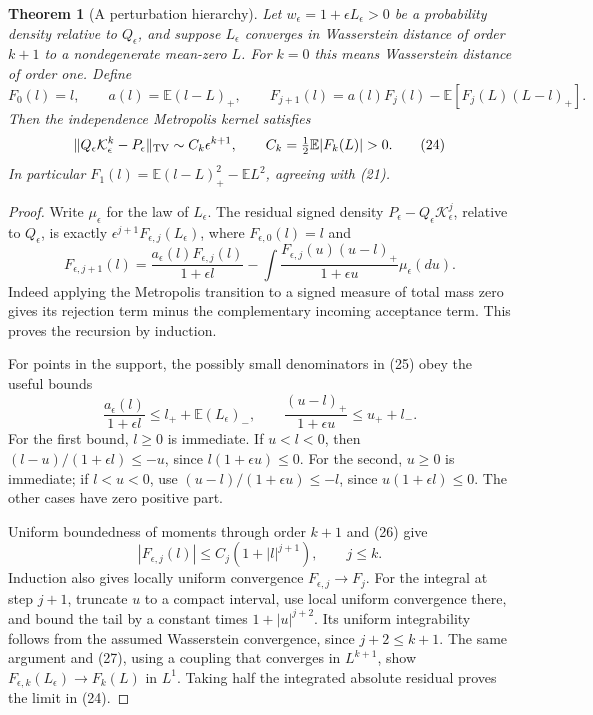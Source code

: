 \documentclass[11pt]{article}
\newtheorem{theorem}{Theorem}\newtheorem{lemma}[theorem]{Lemma}
\newcommand{\E}{\mathbb E}\newcommand{\R}{\mathbb R}
\begin{document}
\begin{theorem}[A perturbation hierarchy]\label{thm:hierarchy}
Let $w_\epsilon=1+\epsilon L_\epsilon>0$ be a probability density
relative to $Q_\epsilon$, and suppose $L_\epsilon$ converges in
Wasserstein distance of order $k+1$ to a nondegenerate mean-zero $L$.
For $k=0$ this means Wasserstein distance of order one. Define
\[
 F_0(l)=l,\qquad a(l)=\E(l-L)_+,\qquad
 F_{j+1}(l)=a(l)F_j(l)-\E[F_j(L)(L-l)_+].               \tag{23}
\]
Then the independence Metropolis kernel satisfies
\[
 \|Q_\epsilon\mathcal K_\epsilon^k-P_\epsilon\|_{\TV}
       \sim C_k\epsilon^{k+1},\qquad
 C_k=\tfrac12\E|F_k(L)|>0.                             \tag{24}
\]
In particular $F_1(l)=\E(l-L)_+^2-\E L^2$, agreeing with (21).
\end{theorem}
\begin{proof}
Write $\mu_\epsilon$ for the law of $L_\epsilon$. The residual signed
density $P_\epsilon-Q_\epsilon\mathcal K_\epsilon^j$, relative to
$Q_\epsilon$, is exactly $\epsilon^{j+1}F_{\epsilon,j}(L_\epsilon)$,
where $F_{\epsilon,0}(l)=l$ and
\[
 F_{\epsilon,j+1}(l)=
 \frac{a_\epsilon(l)F_{\epsilon,j}(l)}{1+\epsilon l}
 -\int\frac{F_{\epsilon,j}(u)(u-l)_+}{1+\epsilon u}
                                                    \mu_\epsilon(du).
 \tag{25}
\]
Indeed applying the Metropolis transition to a signed measure of total
mass zero gives its rejection term minus the complementary incoming
acceptance term. This proves the recursion by induction.

For points in the support, the possibly small denominators in (25) obey
the useful bounds
\[
 \frac{a_\epsilon(l)}{1+\epsilon l}
       \le l_++\E(L_\epsilon)_-,\qquad
 \frac{(u-l)_+}{1+\epsilon u}\le u_++l_-.              \tag{26}
\]
For the first bound, $l\ge0$ is immediate. If $u<l<0$, then
$(l-u)/(1+\epsilon l)\le-u$, since
$l(1+\epsilon u)\le0$. For the second, $u\ge0$ is immediate; if
$l<u<0$, use $(u-l)/(1+\epsilon u)\le-l$, since
$u(1+\epsilon l)\le0$. The other cases have zero positive part.

Uniform boundedness of moments through order $k+1$ and (26) give
\[
 |F_{\epsilon,j}(l)|\le C_j(1+|l|^{j+1}),\qquad j\le k. \tag{27}
\]
Induction also gives locally uniform convergence
$F_{\epsilon,j}\to F_j$. For the integral at step $j+1$, truncate
$u$ to a compact interval, use local uniform convergence there, and
bound the tail by a constant times $1+|u|^{j+2}$. Its uniform
integrability follows from the assumed Wasserstein convergence, since
$j+2\le k+1$. The same argument and (27), using a coupling that
converges in $L^{k+1}$, show
$F_{\epsilon,k}(L_\epsilon)\to F_k(L)$ in $L^1$.
Taking half the integrated absolute residual proves the limit in (24).


\end{proof}
\end{document}
